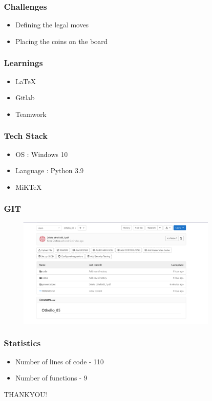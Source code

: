 \documentclass[14pt]{beamer}
\begin{document}
 \begin{frame}
	\frametitle{Challenges}
        \begin{itemize}
	     \item Defining the legal moves
           \item Placing the coins on the board
     \end{itemize}
\end{frame}
    \begin{frame}
        \frametitle{Learnings}
	\begin{itemize}
	      \item LaTeX
            \item Gitlab
             \item Teamwork
	\end{itemize}
    \end{frame}

\begin{frame}
    \frametitle {Tech Stack}
     \begin{itemize}
         \item OS : Windows 10
          \item Language : Python 3.9
           \item MiKTeX
       \end{itemize}
\end{frame}
   
  \begin{frame}
      \frametitle{GIT}
         \begin{figure}
             \includegraphics [width = 10cm] {repository.png}
         \end{figure}
      \end{frame}
 \begin{frame}
    \frametitle {Statistics}
      \begin {itemize}
        \item Number of lines of code - 110
         \item Number of functions - 9
        \end {itemize}
\end{frame}
         
    \begin{frame}
	\begin{center}
	     THANKYOU!
	\end{center}
    \end{frame}
\end{document}
